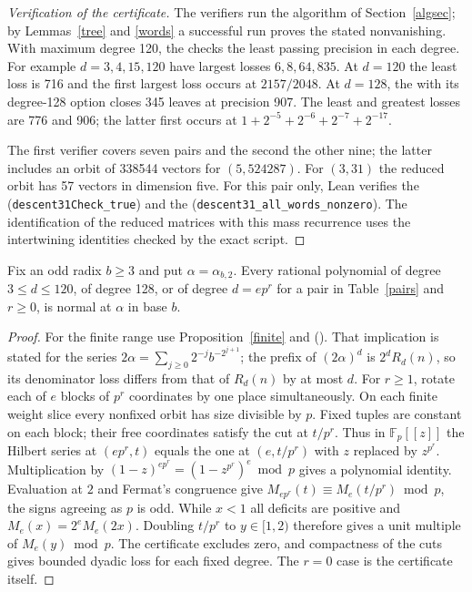 \documentclass[11pt]{article}
\begin{document}
\begin{proof}[Verification of the certificate]
The verifiers run the algorithm of Section~\ref{algsec}; by
Lemmas~\ref{tree} and \ref{words} a successful run proves the stated
nonvanishing. With maximum degree 120, the
 checks the least
passing precision in each degree. For example \(d=3,4,15,120\) have
largest losses \(6,8,64,835\). At \(d=120\) the least loss is 716
and the first largest loss occurs at \(2157/2048\).
At \(d=128\), the 
with its degree-128 option closes 345 leaves at precision 907.
The least and greatest losses are 776 and 906; the latter first occurs at
\(1+2^{-5}+2^{-6}+2^{-7}+2^{-17}\).

The first verifier covers seven pairs and the second the other nine;
the latter includes an orbit of 338544 vectors for \((5,524287)\).
For \((3,31)\) the reduced orbit has 57 vectors in dimension five.
For this pair only, Lean verifies the
(\texttt{descent31Check\_true}) and the
(\texttt{descent31\_all\_words\_nonzero}).
The identification of the reduced matrices with this mass recurrence uses
the intertwining identities checked by the exact script.
\end{proof}


\begin{theorem}\label{degrees}
Fix an odd radix \(b\ge3\) and put \(\alpha=\alpha_{b,2}\).
Every rational polynomial of degree \(3\le d\le120\), of degree 128, or
of degree \(d=ep^r\) for a pair in Table~\ref{pairs} and \(r\ge0\), is
normal at \(\alpha\) in base \(b\).
\end{theorem}
\begin{proof}
For the finite range use Proposition~\ref{finite} and
(). That implication is
stated for the series \(2\alpha=\sum_{j\ge0}2^{-j}b^{-2^{j+1}}\); the
prefix of \((2\alpha)^d\) is \(2^dR_d(n)\), so its denominator loss differs
from that of \(R_d(n)\) by at most \(d\).
For \(r\ge1\), rotate each of \(e\) blocks of \(p^r\) coordinates by one
place simultaneously. On each finite weight slice every nonfixed orbit
has size divisible by \(p\). Fixed tuples are constant on each block;
their free coordinates satisfy the cut at \(t/p^r\). Thus in \(\mathbb F_p[[z]]\)
the Hilbert series at \((ep^r,t)\) equals the one at \((e,t/p^r)\)
with \(z\) replaced by \(z^{p^r}\). Multiplication by
\((1-z)^{ep^r}=(1-z^{p^r})^e\bmod p\) gives a polynomial identity.
Evaluation at \(2\) and Fermat's congruence give
\(M_{ep^r}(t)\equiv M_e(t/p^r)\bmod p\), the signs agreeing as \(p\)
is odd. While \(x<1\) all deficits are positive and
\(M_e(x)=2^e M_e(2x)\). Doubling \(t/p^r\) to \(y\in[1,2)\)
therefore gives a unit multiple of \(M_e(y)\bmod p\). The certificate
excludes zero, and compactness of the cuts gives bounded dyadic loss for
each fixed degree. The \(r=0\) case is the certificate itself.
\end{proof}
\end{document}
